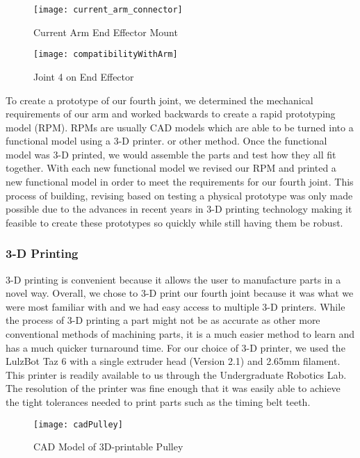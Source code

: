 \begin{figure}[H]
	\centering
	\texttt{[image: current\_arm\_connector]}
	\caption{Current Arm End Effector Mount}
	\label{Current Arm Encoder Mount}
\end{figure}

\begin{figure}[H]
	\centering
	\texttt{[image: compatibilityWithArm]}
	\caption{Joint 4 on End Effector}
	\label{lbl:Joint 4 on End Effector}
\end{figure}

\noindent To create a prototype of our fourth joint, we determined the mechanical requirements of our arm and worked backwards to create a rapid prototyping model (RPM).  RPMs are usually CAD models which are able to be turned into a functional model using a 3-D printer. or other method.  Once the functional model was 3-D printed, we would assemble the parts and test how they all fit together.  With each new functional model we revised our RPM and printed a new functional model in order to meet the requirements for our fourth joint. This process of building, revising based on testing a physical prototype was only made possible due to the advances in recent years in 3-D printing technology making it feasible to create these prototypes so quickly while still having them be robust. 


\subsubsection{3-D Printing}
3-D printing is convenient because it allows the user to manufacture parts in a novel way. Overall, we chose to 3-D print our fourth joint because it was what we were most familiar with and we had easy access to multiple 3-D printers.  While the process of 3-D printing a part might not be as accurate as other more conventional methods of machining parts, it is a much easier method to learn and has a much quicker turnaround time. For our choice of 3-D printer, we used the LulzBot Taz 6 \cite{Taz6} with a single extruder head (Version 2.1) and 2.65mm filament. This printer is readily available to us through the Undergraduate Robotics Lab. The resolution of the printer was fine enough that it was easily able to achieve the tight tolerances needed to print parts such as the timing belt teeth.  

\begin{figure}[H]
	\centering
	\texttt{[image: cadPulley]}
	\caption{CAD Model of 3D-printable Pulley}
	\label{CAD Model of 3D-printable Pulley}
\end{figure}

